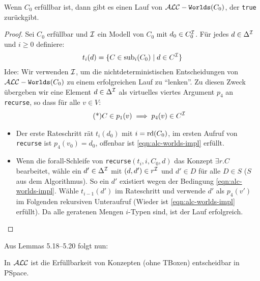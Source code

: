 \begin{lemma}
    Wenn $C_0$ erfüllbar ist, dann gibt es einen Lauf von 
    $\mathcal{A}\mathcal{L}\mathcal{C}-\texttt{Worlds}(C_0)$, der \texttt{true} zurückgibt.
    \begin{proof}
        Sei $C_0$ erfüllbar und $\mathcal{I}$ ein Modell von $C_0$ mit $d_0 \in C_0^{\mathcal{I}}$. Für jedes $d \in \Delta^{\mathcal{I}}$ und $i \geq 0$ definiere:
        \begin{align*}
            t_i(d) = \{C \in \operatorname{sub}_i(C_0) \mid d \in C^{\mathcal{I}}\}
        \end{align*}
        Idee: Wir verwenden $\mathcal{I}$, um die nichtdeterministischen Entscheidungen von $\mathcal{A}\mathcal{L}\mathcal{C}-\texttt{Worlds}(C_0)$ zu einem erfolgreichen Lauf zu \enquote{lenken}. Zu diesen Zweck übergeben wir eine Element $d \in \Delta^{\mathcal{I}}$ als virtuelles viertes Argument $p_4$ an \texttt{recurse}, so dass für alle $v \in V$:
        \begin{align*}
             \tag{*}
             \label{eqn:alc-worlds-impl}
            C \in p_1(v) \implies p_4(v) \in C^{\mathcal{I}}
        \end{align*}
        \begin{tafel}\mbox{}
            \begin{itemize}
                \item Der erste Rateschritt rät $t_i(d_0)$ mit $i = \operatorname{rd}(C_0)$,
                    im ersten Aufruf von \texttt{recurse} ist $p_4(v_0) = d_0$, offenbar ist \eqref{eqn:alc-worlds-impl} erfüllt.
                \item Wenn die forall-Schleife von \texttt{recurse}$(t_i, i, C_0, d)$ das Konzept $\exists r.C$ bearbeitet, wähle ein $d' \in \Delta^{\mathcal{I}}$ mit $(d, d') \in r^{\mathcal{I}}$ und $d' \in D$ für alle $D \in S$ ($S$ aus dem Algorithmus). So ein $d'$ existiert wegen der Bedingung \eqref{eqn:alc-worlds-impl}. Wähle $t_{i - 1}(d')$ im Rateschritt und verwende $d'$ als $p_4(v')$ im Folgenden rekursiven Unteraufruf (Wieder ist \eqref{eqn:alc-worlds-impl} erfüllt). Da alle geratenen Mengen $i$-Typen sind, ist der Lauf erfolgreich.
            \end{itemize}
        \end{tafel}
    \end{proof}
\end{lemma}

Aus Lemmas 5.18--5.20 folgt nun:
\begin{theorem}\label{thm:alc-pspace}
    In $\mathcal{A}\mathcal{L}\mathcal{C}$ ist die Erfüllbarkeit von Konzepten (ohne TBoxen) entscheidbar in PSpace.
\end{theorem}

